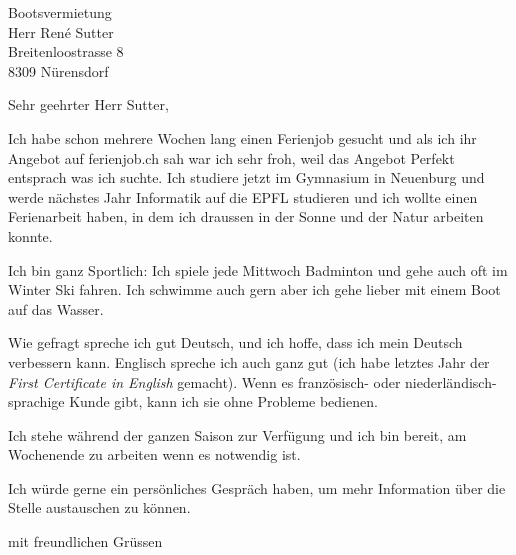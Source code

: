 \documentclass[10pt,a4paper]{letter}
\date{12. März 2018}
\begin{document}
 
\begin{letter}{Bootsvermietung \\ Herr René Sutter \\ Breitenloostrasse 8 \\ 8309 Nürensdorf} 
\opening{Sehr geehrter Herr Sutter,} 
 
Ich habe schon mehrere Wochen lang einen Ferienjob gesucht und als ich ihr Angebot auf ferienjob.ch sah war ich sehr froh, weil das Angebot Perfekt entsprach was ich suchte. Ich studiere jetzt im Gymnasium in Neuenburg und werde nächstes Jahr Informatik auf die EPFL studieren und ich wollte einen Ferienarbeit haben, in dem ich draussen in der Sonne und der Natur arbeiten konnte.


Ich bin ganz Sportlich: Ich spiele jede Mittwoch Badminton und gehe auch oft im Winter Ski fahren. Ich schwimme auch gern aber ich gehe lieber mit einem Boot auf das Wasser. 


Wie gefragt spreche ich gut Deutsch, und ich hoffe, dass ich mein Deutsch verbessern kann. Englisch spreche ich auch ganz gut (ich habe letztes Jahr der \textit{First Certificate in English} gemacht). Wenn es französisch- oder niederländisch-\\sprachige Kunde gibt, kann ich sie ohne Probleme bedienen.


Ich stehe während der ganzen Saison zur Verfügung und ich bin bereit, am Wochenende zu arbeiten wenn es notwendig ist.


Ich würde gerne ein persönliches Gespräch haben, um mehr Information über die Stelle austauschen zu können.

 
\closing{mit freundlichen Grüssen} 
\end{letter} 
\end{document}

